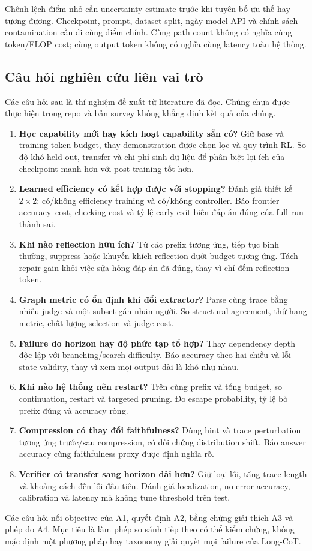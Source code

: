 Chênh lệch điểm nhỏ cần uncertainty estimate trước khi tuyên bố ưu thế hay tương đương. Checkpoint, prompt, dataset split, ngày model API và chính sách contamination cần đi cùng điểm chính. Cùng path count không có nghĩa cùng token/FLOP cost; cùng output token không có nghĩa cùng latency toàn hệ thống.

\subsection{Câu hỏi nghiên cứu liên vai trò}
\label{subsec:research_questions}

Các câu hỏi sau là thí nghiệm đề xuất từ literature đã đọc. Chúng chưa được thực hiện trong repo và bản survey không khẳng định kết quả của chúng.

\begin{enumerate}
\item \textbf{Học capability mới hay kích hoạt capability sẵn có?} Giữ base và training-token budget, thay demonstration được chọn lọc và quy trình RL. So độ khó held-out, transfer và chi phí sinh dữ liệu để phân biệt lợi ích của checkpoint mạnh hơn với post-training tốt hơn.
\item \textbf{Learned efficiency có kết hợp được với stopping?} Đánh giá thiết kế $2\times2$: có/không efficiency training và có/không controller. Báo frontier accuracy--cost, checking cost và tỷ lệ early exit biến đáp án đúng của full run thành sai.
\item \textbf{Khi nào reflection hữu ích?} Từ các prefix tương ứng, tiếp tục bình thường, suppress hoặc khuyến khích reflection dưới budget tương ứng. Tách repair gain khỏi việc sửa hỏng đáp án đã đúng, thay vì chỉ đếm reflection token.
\item \textbf{Graph metric có ổn định khi đổi extractor?} Parse cùng trace bằng nhiều judge và một subset gán nhãn người. So structural agreement, thứ hạng metric, chất lượng selection và judge cost.
\item \textbf{Failure do horizon hay độ phức tạp tổ hợp?} Thay dependency depth độc lập với branching/search difficulty. Báo accuracy theo hai chiều và lỗi state validity, thay vì xem mọi output dài là khó như nhau.
\item \textbf{Khi nào hệ thống nên restart?} Trên cùng prefix và tổng budget, so continuation, restart và targeted pruning. Đo escape probability, tỷ lệ bỏ prefix đúng và accuracy ròng.
\item \textbf{Compression có thay đổi faithfulness?} Dùng hint và trace perturbation tương ứng trước/sau compression, có đối chứng distribution shift. Báo answer accuracy cùng faithfulness proxy được định nghĩa rõ.
\item \textbf{Verifier có transfer sang horizon dài hơn?} Giữ loại lỗi, tăng trace length và khoảng cách đến lỗi đầu tiên. Đánh giá localization, no-error accuracy, calibration và latency mà không tune threshold trên test.
\end{enumerate}

Các câu hỏi nối objective của A1, quyết định A2, bằng chứng giải thích A3 và phép đo A4. Mục tiêu là làm phép so sánh tiếp theo có thể kiểm chứng, không mặc định một phương pháp hay taxonomy giải quyết mọi failure của Long-CoT.

